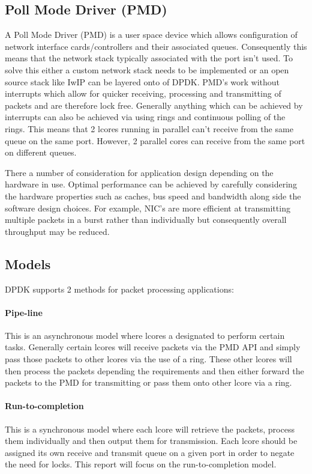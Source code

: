 \documentclass[final_report.tex]{subfiles}
\begin{document}
\subsection{Poll Mode Driver (PMD)}
A Poll Mode Driver (PMD) is a user space device which allows configuration of network interface cards/controllers and their associated queues. Consequently this means that the network stack typically associated with the port isn't used. To solve this either a custom network stack needs to be implemented or an open source stack like IwIP can be layered onto of DPDK. PMD's work without interrupts which allow for quicker receiving, processing and transmitting of packets and are therefore lock free. Generally anything which can be achieved by interrupts can also be achieved via using rings and continuous polling of the rings. This means that 2 lcores running in parallel can't receive from the same queue on the same port. However, 2 parallel cores can receive from the same port on different queues.

There a number of consideration for application design depending on the hardware in use. Optimal performance can be achieved by carefully considering the hardware properties such as caches, bus speed and bandwidth along side the software design choices. For example, NIC's are more efficient at transmitting multiple packets in a burst rather than individually but consequently overall throughput may be reduced.

\subsection{Models}
DPDK supports 2 methods for packet processing applications:

\paragraph*{Pipe-line}
This is an asynchronous model where lcores a designated to perform certain tasks. Generally certain lcores will receive packets via the PMD API and simply pass those packets to other lcores via the use of a ring. These other lcores will then process the packets depending the requirements and then either forward the packets to the PMD for transmitting or pass them onto other lcore via a ring.

\paragraph*{Run-to-completion}
This is a synchronous model where each lcore will retrieve the packets, process them individually and then output them for transmission. Each lcore should be assigned its own receive and transmit queue on a given port in order to negate the need for locks. This report will focus on the run-to-completion model.
\end{document}
